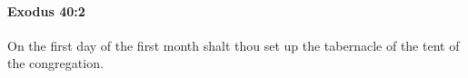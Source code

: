 
		\paragraph{Exodus 40:2} %
			\label{EXODUS-40-2}

			On the first day of the first month shalt thou set up the tabernacle of the tent of the congregation.


